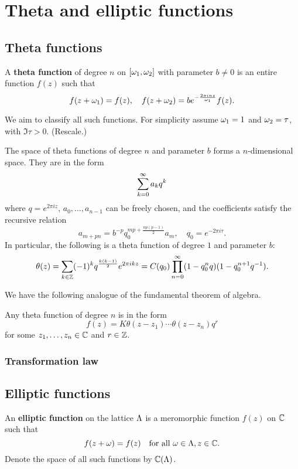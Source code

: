 \chapter{Theta and elliptic functions}
\section{Theta functions}
\begin{df}
A \textbf{theta function} of degree $n$ on $[\omega_1,\omega_2]$ 
with parameter $b\ne0$ is an entire function $f(z)$ such that
\[
f(z+\omega_1)=f(z),\quad f(z+\omega_2)=be^{-\frac{2\pi inz}{\omega_1}}f(z).
\]
\end{df}
We aim to classify all such functions. For simplicity assume $\omega_1=1$ and $\omega_2=\tau$, with $\Im \tau>0$. (Rescale.)
\begin{pr}
The space of theta functions of degree $n$ and parameter $b$ forms a $n$-dimensional space. They are in the form
\[
\sum_{k=0}^{\infty} a_k q^k
\]
where $q=e^{2\pi iz}$, $a_0,\ldots, a_{n-1}$ can be freely chosen, and the coefficients satisfy the recursive relation
\[
a_{m+pn}=b^{-p}q_0^{mp+\frac{np(p-1)}2}a_m,\quad q_0=e^{-2\pi i \tau}.
\]
In particular, the following is a theta function of degree $1$ and parameter $b$:
\[
\theta(z)=\sum_{k\in \mathbb{Z}} (-1)^k q^{\frac{k(k-1)}2}e^{2\pi i kz}=C(q_0)\prod_{n=0}^{\infty} (1-q_0^n q)(1-q_0^{n+1}q^{-1}). 
\]
\end{pr}
We have the following analogue of the fundamental theorem of algebra.
\begin{thm}
Any theta function of degree $n$ is in the form
\[
f(z)=K\theta(z-z_1)\cdots \theta(z-z_n)q^r
\]
for some $z_1,\ldots, z_n\in \mathbb{C}$ and $r\in \mathbb{Z}$.
\end{thm}
\subsection{Transformation law}


\section{Elliptic functions}
\begin{df}
An \textbf{elliptic function} on the lattice $\Lambda$ is a meromorphic function $f(z)$ on $\mathbb{C}$ such that
\[
f(z+\omega)=f(z)\quad \text{for all }\omega \in \Lambda, z\in \mathbb{C}.
\]
Denote the space of all such functions by $\mathbb{C}(\Lambda)$.
\end{df}


